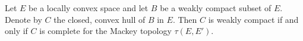 Let $E$ be a locally convex space and let $B$ be a weakly compact subset of $E$. Denote by $C$ the closed, convex hull of $B$ in $E$. Then $C$ is weakly compact if and only if $C$ is complete for the Mackey topology $\tau(E, E')$.
